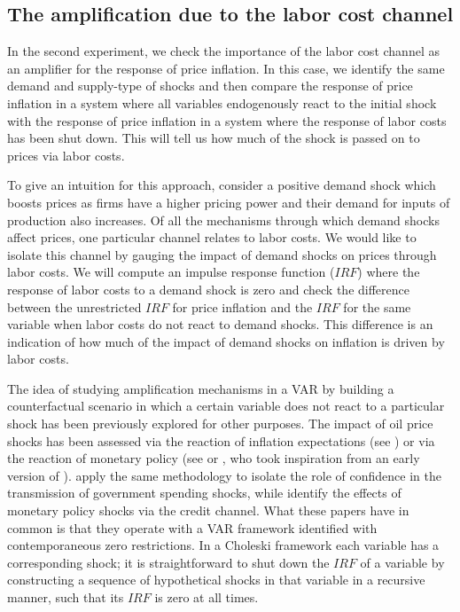 \documentclass[11pt]{article}
\begin{document}
\subsection{The amplification due to the labor cost channel}
In the second experiment, we check the importance of the labor cost channel as an amplifier for the response of price inflation. In this case, we identify the same demand and supply-type of shocks and then compare the response of price inflation in a system where all variables endogenously react to the initial shock with the response of price inflation in a system where the response of labor costs has been shut down. This will tell us how much of the shock is passed on to prices via labor costs.

To give an intuition for this approach, consider a positive demand shock which boosts prices as firms have a higher pricing power and their demand for inputs of production also increases. Of all the mechanisms through which demand shocks affect prices, one particular channel relates to labor costs. We would like to isolate this channel by gauging the impact of demand shocks on prices through labor costs. We will compute an impulse response function ($IRF$) where the response of labor costs to a demand shock is zero and check the difference between the unrestricted $IRF$ for price inflation and the $IRF$ for the same variable when labor costs do not react to demand shocks. This difference is an indication of how much of the impact of demand shocks on inflation is driven by labor costs.

The idea of studying amplification mechanisms in a VAR by building a counterfactual scenario in which a certain variable does not react to a particular shock has been previously explored for other purposes. The impact of oil price shocks has been assessed via the reaction of inflation expectations (see \cite{Wong_2015}) or via the reaction of monetary policy (see \cite{Kilian_Lewis_2011} or \cite{Bernanke_Gertler_Watson_97}, who took inspiration from an early version of \cite{Sims_Zha_2006}). \cite{Bachmann_Sims_2012} apply the same methodology to isolate the role of confidence in the transmission of government spending shocks, while \cite{Ciccarelli_Maddaloni_Peydro_15} identify the effects of monetary policy shocks via the credit channel. What these papers have in common is that they operate with a VAR framework identified with contemporaneous zero restrictions. In a Choleski framework each variable has a corresponding shock; it is straightforward to shut down the $IRF$ of a variable by constructing a sequence of hypothetical shocks in that variable in a recursive manner, such that its $IRF$ is zero at all times. 
\end{document}
